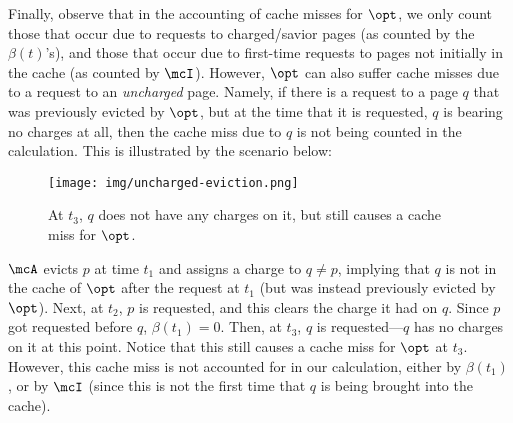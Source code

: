 Finally, observe that in the accounting of cache misses for $\opt$, we only count those that occur due to requests to charged/savior pages (as counted by the $\beta(t)$'s), and those that occur due to first-time requests to pages not initially in the cache (as counted by $\mcI$). However, $\opt$ can also suffer cache misses due to a request to an \textit{uncharged} page. Namely, if there is a request to a page $q$ that was previously evicted by $\opt$, but at the time that it is requested, $q$ is bearing no charges at all, then the cache miss due to $q$ is not being counted in the calculation. This is illustrated by the scenario below: 
\begin{figure}[H]
    \centering
    \texttt{[image: img/uncharged-eviction.png]}
    \caption{At $t_3$, $q$ does not have any charges on it, but still causes a cache miss for $\opt$.}
    \label{fig:uncharged-eviction}
\end{figure}
$\mcA$ evicts $p$ at time $t_1$ and assigns a charge to $q \neq p$, implying that $q$ is not in the cache of $\opt$ after the request at $t_1$ (but was instead previously evicted by $\opt$). Next, at $t_2$, $p$ is requested, and this clears the charge it had on $q$. Since $p$ got requested before $q$, $\beta(t_1)=0$. Then, at $t_3$, $q$ is requested---$q$ has no charges on it at this point. Notice that this still causes a cache miss for $\opt$ at $t_3$. However, this cache miss is not accounted for in our calculation, either by $\beta(t_1)$, or by $\mcI$ (since this is not the first time that $q$ is being brought into the cache).
